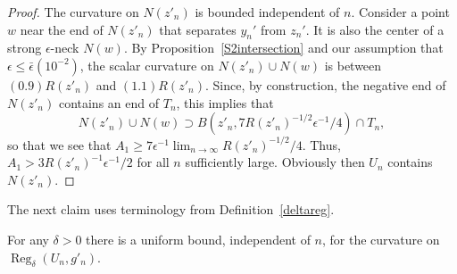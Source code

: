\begin{proof}
The curvature on  $N(z'_n)$ is bounded independent of $n$. Consider
a point $w$ near the end of $N(z'_n)$ that separates $y_n'$ from
$z_n'$. It is also the center of a strong $\epsilon$-neck $N(w)$. By
Proposition~\ref{S2intersection} and our assumption that
$\epsilon\le \bar\epsilon(10^{-2})$, the scalar curvature on
$N(z'_n)\cup N(w)$ is between $(0.9)R(z'_n)$ and $(1.1)R(z'_n)$.
Since, by construction, the negative end of $N(z'_n)$ contains an
end of $T_n$, this implies that
$$N(z'_n)\cup N(w)\supset B(z'_n,7R(z'_n)^{-1/2}\epsilon^{-1}/4)\cap T_n,$$
 so that we see that
$A_1\ge 7\epsilon^{-1}\lim_{n\rightarrow\infty}
R(z'_n)^{-1/2}/4$. Thus, $A_1>3R(z'_n)^{-1}\epsilon^{-1}/2$ for all
$n$ sufficiently large. Obviously then $U_n$ contains $N(z'_n)$.
\end{proof}

The next claim uses terminology from Definition~\ref{deltareg}.

\begin{claim}
\label{claim:uniform-curvature-bound-reg-delta}
For any $\delta>0$ there is a uniform bound, independent of $n$, for
the curvature on $\operatorname{Reg}_\delta(U_n,g'_n)$.
\end{claim}

